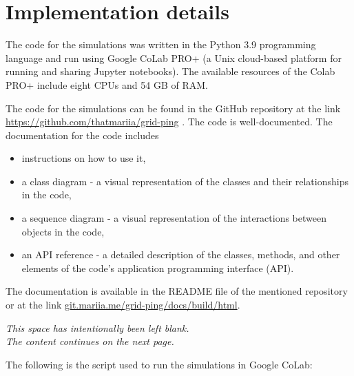 \section{Implementation details}

The code for the simulations was written in the Python 3.9 programming language and run using Google CoLab PRO+ (a Unix cloud-based platform for running and sharing Jupyter notebooks). The available resources of the Colab PRO+ include eight CPUs and 54 GB of RAM.

The code for the simulations can be found in the GitHub repository at the link \url{https://github.com/thatmariia/grid-ping} \cite{github:grid-ping}. The code is well-documented. The documentation for the code includes
\begin{itemize}
    \item instructions on how to use it,
    \item a class diagram - a visual representation of the classes and their relationships in the code,
    \item a sequence diagram - a visual representation of the interactions between objects in the code,
    \item an API reference - a detailed description of the classes, methods, and other elements of the code's application programming interface (API).
\end{itemize}
The documentation is available in the README file of the mentioned repository or at the link \url{git.mariia.me/grid-ping/docs/build/html}.

\vfill

\begin{center} 
{ \it
    This space has intentionally been left blank. \\
    The content continues on the next page.
}
\end{center}

\vfill

\newcommand{\thickhline}{\textcolor{color-three-mid}{\noindent\rule[0.5ex]{\linewidth}{1pt}}}
\newcommand{\normalhline}{\textcolor{color-three-light}{\noindent\rule[0.5ex]{\linewidth}{1pt}}}


\newpage
The following is the script used to run the simulations in Google CoLab:

